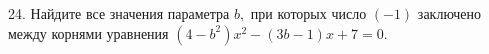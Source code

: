 24. Найдите все значения параметра $b,$ при которых число $(-1)$ заключено между корнями уравнения $(4-b^2)x^2-(3b-1)x+7=0.$\\
